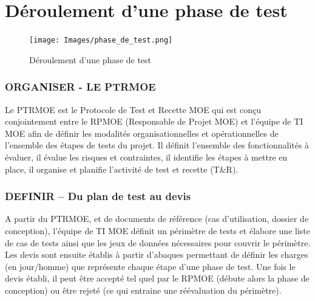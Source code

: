 \section{Déroulement d'une phase de test}

\begin{figure}[h]
  \begin{center}
    \texttt{[image: Images/phase\_de\_test.png]}
  \end{center}
  \caption{Déroulement d'une phase de test}
  \label{Déroulement d'une phase de test}
\end{figure}

\subsubsection*{ORGANISER - LE PTRMOE}
Le PTRMOE est le Protocole de Test et Recette MOE qui est conçu conjointement entre le RPMOE (Responsable de Projet MOE) et l’équipe de TI MOE afin de définir les modalités organisationnelles et opérationnelles de l’ensemble des étapes de tests du projet.
Il définit l’ensemble des fonctionnalités à évaluer, il évalue les risques et contraintes, il identifie les étapes à mettre en place, il organise et planifie l’activité de test et recette (T\&R). 
 
\subsubsection*{DEFINIR – Du plan de test au devis}
A partir du PTRMOE, et de documents de référence (cas d’utilisation, dossier de conception), l’équipe de TI MOE définit un périmètre de tests et élabore une liste de cas de tests ainsi que les jeux de données nécessaires pour couvrir le périmètre.
Les devis sont ensuite établis à partir d’abaques permettant de définir les charges (en jour/homme) que représente chaque étape d’une phase de test.
Une fois le devis établi, il peut être accepté tel quel par le RPMOE (débute alors la phase de conception) ou être rejeté (ce qui entraine une réévaluation du périmètre).

